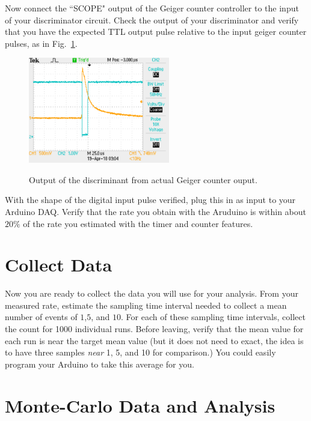 \documentclass[12pt]{article}
\begin{document}
Now connect the ``SCOPE" output of the Geiger counter controller to the input of your discriminator circuit.  Check the output of your discriminator and verify that you have the expected TTL output pulse relative to the input geiger counter pulses, as in Fig.~\ref{fig:expected}.
\begin{figure}[htbp]
\begin{center}
{\includegraphics[width=0.55\textwidth]{figs/real.pdf}}
\end{center}
\caption{\label{fig:expected} Output of the discriminant from actual Geiger counter ouput.}
\end{figure}
With the shape of the digital input pulse verified, plug this in as input to your Arduino DAQ.  Verify that the rate you obtain with the Aruduino is within about $20\%$ of the rate you estimated with the timer and counter features.
 
\section{Collect Data}

Now you are ready to collect the data you will use for your analysis.
From your measured rate, estimate the sampling time interval needed to
collect a mean number of events of $1$,$5$, and $10$.  For each of
these sampling time intervals, collect the count for 1000 individual
runs.  Before leaving, verify that the mean value for each run is near
the target mean value (but it does not need to exact, the idea is to
have three samples {\em near} 1, 5, and 10 for comparison.)  You could
easily program your Arduino to take this average for you.

\section{Monte-Carlo Data and Analysis}
\end{document}
